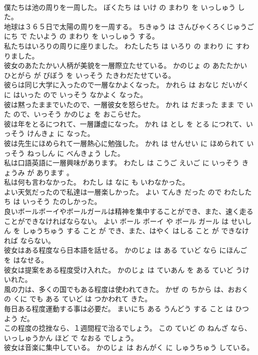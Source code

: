 \documentclass[8pt]{extreport}
\begin{document}
\begin{CJK}{UTF8}{min}
\\	僕たちは池の周りを一周した。	ぼくたち は いけ の まわり を いっしゅう した。	
\\	地球は３６５日で太陽の周りを一周する。	ちきゅう は さんびゃくろくじゅうご にち で たいよう の まわり を いっしゅう する。	
\\	私たちはいろりの周りに座りました。	わたしたち は いろり の まわり に すわりました。	
\\	彼女のあたたかい人柄が美貌を一層際立たせている。	かのじょ の あたたかい ひとがら が びぼう を いっそう たきわだたせている。	
\\	彼らは同じ大学に入ったので一層なかよくなった。	かれら は おなじ だいがく に はいった ので いっそう なかよく なった。	
\\	彼は黙ったままでいたので、一層彼女を怒らせた。	かれ は だまった まま で いた ので、いっそう かのじょ を おこらせた。	
\\	彼は年をとるにつれて、一層謙虚になった。	かれ は とし を とる につれて、いっそう けんきょ に なった。	
\\	彼は先生にほめられて一層熱心に勉強した。	かれ は せんせい に ほめられて いっそう ねっしん に べんきょう した。	
\\	私は口語英語に一層興味があります。	わたし は こうご えいご に いっそう きょうみ が あります 。	
\\	私は何も言わなかった。	わたし は なに も いわなかった。	
\\	よい天気だったので私達は一層楽しかった。	よい てんき だった ので わたしたち は いっそう たのしかった。	
\\	良いボールボーイやボールガールは精神を集中することができ、また、速く走ることができなければならない。	よい ボール ボーイ や ボール ガール は せいしん を しゅうちゅう する こと が でき、また、はやく はしる こと が できなければ ならない。	
\\	彼女はある程度なら日本語を話せる。	かのじょ は ある ていど なら にほんご を はなせる。	
\\	彼女は提案をある程度受け入れた。	かのじょ は ていあん を ある ていど うけいれた。	
\\	風の力は、多くの国でもある程度は使われてきた。	かぜ の ちから は、おおく の くに でも ある ていど は つかわれて きた。	
\\	毎日ある程度運動する事は必要だ。	まいにち ある うんどう する こと は ひつよう だ。	
\\	この程度の捻挫なら、１週間程で治るでしょう。	この ていど の ねんざ なら、いっしゅうかん ほど で なおる でしょう。	
\\	彼女は音楽に集中している。	かのじょ は おんがく に しゅうちゅう している。	

\end{CJK}
\end{document}
